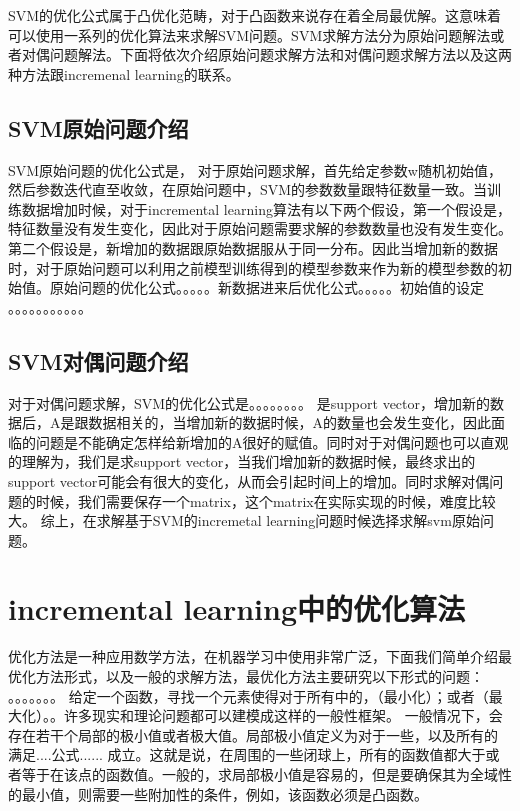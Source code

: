 \documentclass[master]{njuthesis}
\begin{document}
    SVM的优化公式属于凸优化范畴，对于凸函数来说存在着全局最优解。这意味着可以使用一系列的优化算法来求解SVM问题。SVM求解方法分为原始问题解法或者对偶问题解法。下面将依次介绍原始问题求解方法和对偶问题求解方法以及这两种方法跟incremenal learning的联系。

\subsection{SVM原始问题介绍}

    SVM原始问题的优化公式是，
    对于原始问题求解，首先给定参数w随机初始值，然后参数迭代直至收敛，在原始问题中，SVM的参数数量跟特征数量一致。当训练数据增加时候，对于incremental learning算法有以下两个假设，第一个假设是，特征数量没有发生变化，因此对于原始问题需要求解的参数数量也没有发生变化。第二个假设是，新增加的数据跟原始数据服从于同一分布。因此当增加新的数据时，对于原始问题可以利用之前模型训练得到的模型参数来作为新的模型参数的初始值。原始问题的优化公式。。。。。新数据进来后优化公式。。。。。初始值的设定  。。。。。。。。。。。

\subsection{SVM对偶问题介绍}
    
    对于对偶问题求解，SVM的优化公式是。。。。。。。。
    是support vector，增加新的数据后，A是跟数据相关的，当增加新的数据时候，A的数量也会发生变化，因此面临的问题是不能确定怎样给新增加的A很好的赋值。同时对于对偶问题也可以直观的理解为，我们是求support vector，当我们增加新的数据时候，最终求出的support vector可能会有很大的变化，从而会引起时间上的增加。同时求解对偶问题的时候，我们需要保存一个matrix，这个matrix在实际实现的时候，难度比较大。
    综上，在求解基于SVM的incremetal learning问题时候选择求解svm原始问题。


\section{incremental learning中的优化算法}

    优化方法是一种应用数学方法，在机器学习中使用非常广泛，下面我们简单介绍最优化方法形式，以及一般的求解方法，最优化方法主要研究以下形式的问题：
    。。。。。。。
    给定一个函数，寻找一个元素使得对于所有中的，（最小化）；或者（最大化）。。许多现实和理论问题都可以建模成这样的一般性框架。
一般情况下，会存在若干个局部的极小值或者极大值。局部极小值定义为对于一些，以及所有的 满足....公式......
成立。这就是说，在周围的一些闭球上，所有的函数值都大于或者等于在该点的函数值。一般的，求局部极小值是容易的，但是要确保其为全域性的最小值，则需要一些附加性的条件，例如，该函数必须是凸函数。
    
\end{document}
